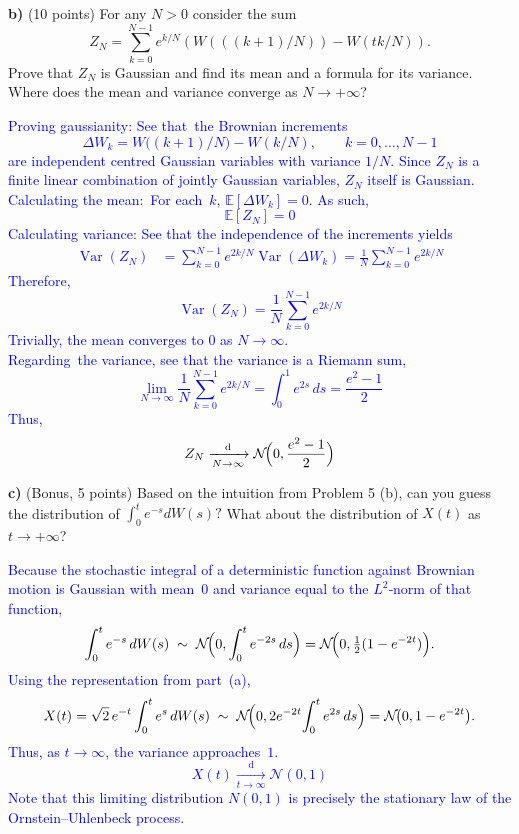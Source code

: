 \documentclass{article}
\begin{document}
\textbf{b)}   (10 points) For any $N > 0$ consider the sum
$$Z_N = \sum_{k=0}^{N-1} e^{k/N}(W(((k+1)/N)) - W(tk/N)).$$
Prove that $Z_N$ is Gaussian and find its mean and a formula for its variance. Where does the mean and variance converge as $N \rightarrow +\infty$?


\textcolor{blue}{
Proving gaussianity: See that the Brownian increments  
$$
\Delta W_{k}=W\!\bigl((k+1)/N\bigr)-W(k/N),\qquad k=0,\dots,N-1
$$
are independent centred Gaussian variables with variance $1/N$. Since $Z_N$ is a finite linear combination of jointly Gaussian variables, $Z_N$ itself is Gaussian. \\
Calculating the mean: For each $k$, $\mathbb E[\Delta W_{k}]=0$. As such,
$$
\mathbb E[Z_N]=0
$$
Calculating variance: See that the independence of the increments yields
\begin{align*}
\operatorname{Var}(Z_N)
&=\sum_{k=0}^{N-1}e^{2k/N}\operatorname{Var}(\Delta W_{k})
=\frac1N\sum_{k=0}^{N-1}e^{2k/N}
\end{align*}
Therefore,
$$
\operatorname{Var}(Z_N)=\frac1N\sum_{k=0}^{N-1}e^{2k/N}
$$
Trivially, the mean converges to $0$ as $N\to\infty$. \\
Regarding the variance, see that the variance is a Riemann sum,
$$
\lim_{N\to\infty}\frac1N\sum_{k=0}^{N-1}e^{2k/N}=\int_{0}^{1}e^{2s}\,ds=\frac{e^{2}-1}{2}
$$
Thus,
$$
Z_N \xrightarrow[N\to\infty]{\;\text{d}\;} \mathcal N\!\Bigl(0,\frac{e^{2}-1}{2}\Bigr)
$$
}


\textbf{c)}   (Bonus, 5 points) Based on the intuition from Problem 5 (b), can you guess the distribution of 
$\int_0^t e^{-s} dW(s)?$ 
What about the distribution of $X(t)$ as $t \rightarrow +\infty$?

\textcolor{blue}{
Because the stochastic integral of a deterministic function against Brownian motion is Gaussian with mean $0$ and variance equal to the $L^{2}$‑norm of that function,
$$
\int_{0}^{t}e^{-s}\,dW(s)\;\sim\;\mathcal N\!\Bigl(0,\int_{0}^{t}e^{-2s}\,ds\Bigr)
          =\mathcal N\!\Bigl(0,\tfrac12(1-e^{-2t})\Bigr).
$$
Using the representation from part (a),
$$
X(t)=\sqrt2\,e^{-t}\int_{0}^{t}e^{s}\,dW(s)
     \;\sim\;\mathcal N\!\Bigl(0,2e^{-2t}\!\int_{0}^{t}e^{2s}\,ds\Bigr)
     =\mathcal N\!\bigl(0,1-e^{-2t}\bigr).
$$
Thus, as $t\to\infty$, the variance approaches $1$.
$$
X(t)\xrightarrow[t\to\infty]{\;\text{d}\;}\mathcal N(0,1)
$$
Note that this limiting distribution $N(0,1)$ is precisely the stationary law of the Ornstein–Uhlenbeck process.
}
\end{document}
